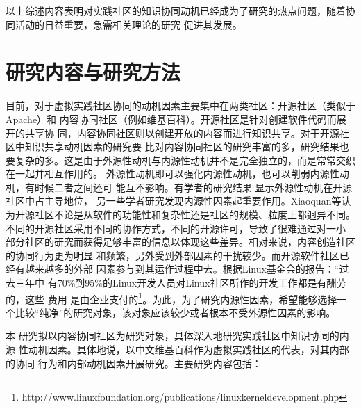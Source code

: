 以上综述内容表明对实践社区的知识协同动机已经成为了研究的热点问题，随着协同活动的日益重要，急需相关理论的研究
促进其发展。



\section{研究内容与研究方法}

目前，对于虚拟实践社区协同的动机因素主要集中在两类社区：开源社区（类似于Apache）和
内容协同社区（例如维基百科）。开源社区是针对创建软件代码而展开的共享协
同，内容协同社区则以创建开放的内容而进行知识共享。对于开源社区中知识共享动机因素的研究要
比对内容协同社区的研究丰富的多，研究结果也要复杂的多。这是由于外源性动机与内源性动机并不是完全独立的，而是常常交织在一起并相互作用的。
外源性动机即可以强化内源性动机，也可以削弱内源性动机，有时候二者之间还可
能互不影响\cite{deci1971eem}。有学者的研究结果
显示外源性动机在开源社区中占主导地位\cite{10.1109/HICSS.2001.927045}，
另一些学者研究发现内源性因素起重要作用\cite{Lakhani2003}。Xiaoquan等认
为开源社区不论是从软件的功能性和复杂性还是社区的规模、粒度上都迥异不同。
不同的开源社区采用不同的协作方式，不同的开源许可，导致了很难通过对一小
部分社区的研究而获得足够丰富的信息以体现这些差异\cite{Zhang2006}。相对来说，内容创造社区的协同行为更为明显
和频繁，另外受到外部因素的干扰较少。而开源软件社区已经有越来越多的外部
因素参与到其运作过程中去。根据Linux基金会的报告：“过去三年中
有70\%到95\%的Linux开发人员对Linux社区所作的开发工作都是有酬劳的，这些
费用 是由企业支付的\footnote{http://www.linuxfoundation.org/publications/linuxkerneldevelopment.php}。为此，为了研究内源性因素，希望能够选择一
个比较“纯净”的研究对象，该对象应该较少或者根本不受外源性因素的影响。

本
研究拟以内容协同社区为研究对象，具体深入地研究实践社区中知识协同的内源
性动机因素。具体地说，以中文维基百科作为虚拟实践社区的代表，对其内部的协同
行为和内部动机因素开展研究。主要研究内容包括：

